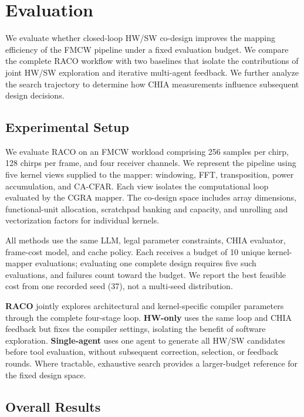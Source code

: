 \documentclass[conference,letterpaper]{IEEEtran}
\begin{document}
\section{Evaluation}
We evaluate whether closed-loop HW/SW co-design improves the mapping efficiency of the FMCW pipeline under a fixed evaluation budget. We compare the complete RACO workflow with two baselines that isolate the contributions of joint HW/SW exploration and iterative multi-agent feedback. We further analyze the search trajectory to determine how CHIA measurements influence subsequent design decisions.

\subsection{Experimental Setup}

We evaluate RACO on an FMCW workload comprising 256 samples per chirp, 128 chirps per frame, and four receiver channels. We represent the pipeline using five kernel views supplied to the mapper: windowing, FFT, transposition, power accumulation, and CA-CFAR. Each view isolates the computational loop evaluated by the CGRA mapper. The co-design space includes array dimensions, functional-unit allocation, scratchpad banking and capacity, and unrolling and vectorization factors for individual kernels.

All methods use the same LLM, legal parameter constraints, CHIA evaluator, frame-cost model, and cache policy. Each receives a budget of 10 unique kernel-mapper evaluations; evaluating one complete design requires five such evaluations, and failures count toward the budget. We report the best feasible cost from one recorded seed (37), not a multi-seed distribution.

\textbf{RACO} jointly explores architectural and kernel-specific compiler parameters through the complete four-stage loop. \textbf{HW-only} uses the same loop and CHIA feedback but fixes the compiler settings, isolating the benefit of software exploration. \textbf{Single-agent} uses one agent to generate all HW/SW candidates before tool evaluation, without subsequent correction, selection, or feedback rounds. Where tractable, exhaustive search provides a larger-budget reference for the fixed design space.


\subsection{Overall Results}

%
\end{document}

